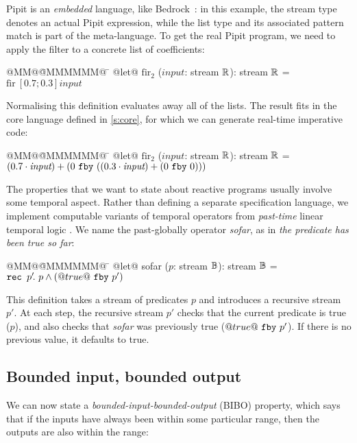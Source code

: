 \documentclass[sigplan,screen, review]{acmart}
\begin{document}
Pipit is an \emph{embedded} language, like Bedrock~\cite{chlipala2013bedrock}: in this example, the stream type denotes an actual Pipit expression, while the list type and its associated pattern match is part of the \fstar{} meta-language.
To get the real Pipit program, we need to apply the filter to a concrete list of coefficients:

\newcommand\bibo{\mbox{bibo}}
\newcommand\fir{\mbox{fir}}
\newcommand\ii{\textit{input}}
\newcommand\oo{\textit{output}}
\newcommand\ok{\textit{ok}}
\begin{tabbing}
  @MM@\= @MMMMMM@ \= \kill
  @let@ $\mbox{fir}_2$ ($\ii$: stream $\mathbb{R}$): stream $\mathbb{R}$ = \\
    \> $\mbox{fir}~[0.7; 0.3] \ii$
\end{tabbing}

Normalising this definition evaluates away all of the lists.
The result fits in the core language defined in \autoref{s:core}, for which we can generate real-time imperative code:

\begin{tabbing}
    @MM@\= @MMMMMM@ \= \kill
      @let@ $\mbox{fir}_2$ ($\ii$: stream $\mathbb{R}$): stream $\mathbb{R}$ = \\
    \> $(0.7 \cdot \ii) + (\xfby{0}{((0.3 \cdot \ii) + (\xfby{0}{0}))})$
\end{tabbing}

The properties that we want to state about reactive programs usually involve some temporal aspect.
Rather than defining a separate specification language, we implement computable variants of temporal operators from \emph{past-time} linear temporal logic \cite{halbwachs1993executable,lichtenstein1985glory}.
We name the past-globally operator \emph{sofar}, as in \emph{the predicate has been true so far}:

\begin{tabbing}
  @MM@\= @MMMMMM@ \= \kill
  @let@ sofar ($p$: stream $\mathbb{B}$): stream $\mathbb{B}$ = \\
    \> $\texttt{rec~} p' \!.~p \wedge (@true@~\texttt{fby}~p')$
\end{tabbing}

This definition takes a stream of predicates $p$ and introduces a recursive stream $p'$.
At each step, the recursive stream $p'$ checks that the current predicate is true ($p$), and also checks that \emph{sofar} was previously true ($@true@~\texttt{fby}~p'$).
If there is no previous value, it defaults to true.

\subsection{Bounded input, bounded output}
\label{ss:tut:bibo}
We can now state a \emph{bounded-input-bounded-output} (BIBO) property, which says that if the inputs have always been within some particular range, then the outputs are also within the range:
\end{document}
